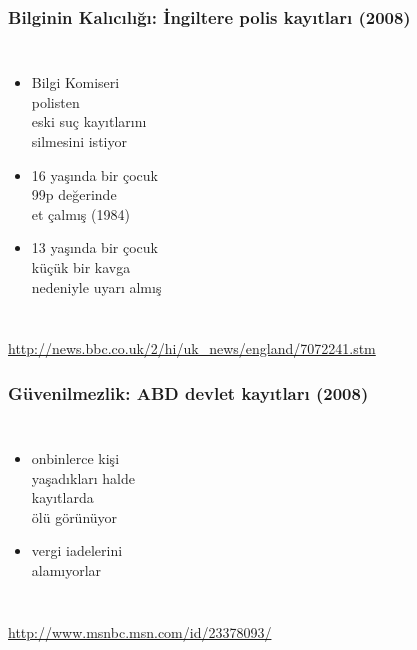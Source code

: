 \documentclass[dvipsnames]{beamer}
\theoremstyle{definition}
\theoremstyle{example}
\theoremstyle{plain}
\begin{document}
\begin{frame}
  \frametitle{Bilginin Kalıcılığı: İngiltere polis kayıtları (2008)}

  \begin{columns}

    \begin{itemize}
      \item Bilgi Komiseri\\
        polisten\\
        eski suç kayıtlarını\\
        silmesini istiyor

      \medskip
      \item 16 yaşında bir çocuk\\
        99p değerinde\\
        et çalmış (1984)
      \item 13 yaşında bir çocuk\\
        küçük bir kavga\\
        nedeniyle uyarı almış
    \end{itemize}
  \end{columns}

  \medskip
  \tiny{\url{http://news.bbc.co.uk/2/hi/uk_news/england/7072241.stm}}
\end{frame}

\begin{frame}
  \frametitle{Güvenilmezlik: ABD devlet kayıtları (2008)}

  \begin{columns}

    \begin{itemize}
      \item onbinlerce kişi\\
        yaşadıkları halde\\
        kayıtlarda\\
        ölü görünüyor
      \item vergi iadelerini\\
        alamıyorlar
    \end{itemize}
  \end{columns}

  \medskip
  \tiny{\url{http://www.msnbc.msn.com/id/23378093/}}
\end{frame}
\end{document}
